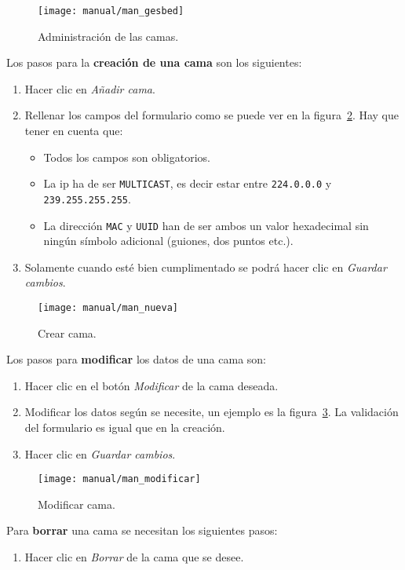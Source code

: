\begin{figure}
	\centering
	\texttt{[image: manual/man\_gesbed]}
	\caption{Administración de las camas.}
	\label{fig:man_menu_cama}
\end{figure}

Los pasos para la \textbf{creación de una cama} son los siguientes:
\begin{enumerate}
	\item Hacer clic en \textit{Añadir cama}.
	\item Rellenar los campos del formulario como se puede ver en la figura~\ref{fig:man_new_bed}. Hay que tener en cuenta que:
	\begin{itemize}
		\item Todos los campos son obligatorios.
		\item La ip ha de ser \texttt{MULTICAST}, es decir estar entre \texttt{224.0.0.0} y \texttt{239.255.255.255}.
		\item La dirección \texttt{MAC} y \texttt{UUID} han de ser ambos un valor hexadecimal sin ningún símbolo adicional (guiones, dos puntos etc.).
	\end{itemize}
	\item Solamente cuando esté bien cumplimentado se podrá hacer clic en \textit{Guardar cambios}.
\end{enumerate}

\begin{figure}
	\centering
	\texttt{[image: manual/man\_nueva]}
	\caption{Crear cama.}
	\label{fig:man_new_bed}
\end{figure}

Los pasos para \textbf{modificar} los datos de una cama son:
\begin{enumerate}
	\item Hacer clic en el botón \textit{Modificar} de la cama deseada.
	\item Modificar los datos según se necesite, un ejemplo es la figura~\ref{fig:man_mod_bed}. La validación del formulario es igual que en la creación.
	\item Hacer clic en \textit{Guardar cambios}.
\end{enumerate}

\begin{figure}
	\centering
	\texttt{[image: manual/man\_modificar]}
	\caption{Modificar cama.}
	\label{fig:man_mod_bed}
\end{figure}

Para \textbf{borrar} una cama se necesitan los siguientes pasos:
\begin{enumerate}
	\item Hacer clic en \textit{Borrar} de la cama que se desee.
\end{enumerate}

